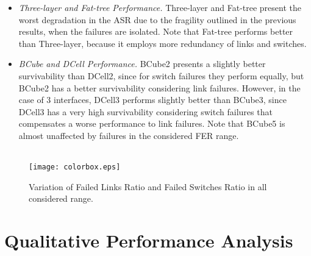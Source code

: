 \begin{itemize}
\item \textit{Three-layer and Fat-tree Performance.} Three-layer and Fat-tree present the worst degradation in the ASR due to the fragility outlined in the previous results, when the failures are isolated. Note that Fat-tree performs better than Three-layer, because it employs more redundancy of links and switches.
\item \textit{BCube and DCell Performance.} BCube2 presents a slightly better survivability than DCell2, since for switch failures they perform equally, but BCube2 has a better survivability considering link failures. However, in the case of 3 interfaces, DCell3 performs slightly better than BCube3, since DCell3 has a very high survivability considering switch failures that compensates a worse performance to link failures. Note that BCube5 is almost unaffected by failures in the considered FER range.
\end{itemize}
\begin{figure}
\centering
{}
\\
{\texttt{[image: colorbox.eps]}}
\caption{Variation of Failed Links Ratio and Failed Switches Ratio in all considered range.}
\label{fig:allRangelinkSwitch}
\end{figure}

\section{Qualitative Performance Analysis}
\label{sec:qualitative}

